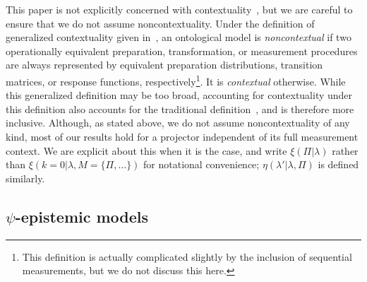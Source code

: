 \documentclass[%
 reprint, onecolumn, 12pt,
superscriptaddress,
nofootinbib,
 prx, 
]{quantumarticle}
\begin{document}
This paper is not explicitly concerned with
contextuality~\cite{KochenProblemHiddenVariables1967,SpekkensContextualitypreparationstransformations2005},
but we are careful to ensure that we do not assume
noncontextuality. Under the definition of generalized contextuality
given in~\cite{SpekkensContextualitypreparationstransformations2005},
an ontological model is \emph{noncontextual} if two operationally
equivalent preparation, transformation, or measurement procedures are
always represented by equivalent preparation distributions, transition
matrices, or response functions, respectively\footnote{This definition
  is actually complicated slightly by the inclusion of sequential
  measurements, but we do not discuss this here.}. It is
\emph{contextual} otherwise. While this generalized definition may be
too broad, accounting for contextuality under this definition also
accounts for the traditional
definition~\cite{KochenProblemHiddenVariables1967}, and is therefore
more inclusive. Although, as stated above, we do not assume
noncontextuality of any kind, most of our results hold for a projector
independent of its full measurement context. We are explicit about
this when it is the case, and write $\xi(\Pi|\lambda)$ rather than
$\xi(k=0|\lambda,M=\{\Pi,\ldots\})$ for notational convenience;
$\eta(\lambda'|\lambda,\Pi)$ is defined similarly.



\subsection{$\psi$-epistemic models}
\label{sec:psi-epistemic-models}
\end{document}
